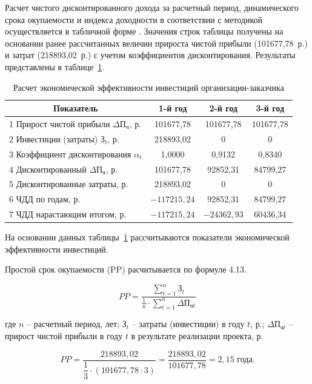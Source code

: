 Расчет чистого дисконтированного дохода за расчетный период, динамического срока окупаемости и индекса доходности в соответствии с методикой осуществляется в табличной форме \cite{Economics}. Значения строк таблицы получены на основании ранее рассчитанных величин прироста чистой прибыли (101677{,}78~р.) и затрат (218893{,}02~р.) с учетом коэффициентов дисконтирования. Результаты представлены в таблице~\ref{tab3}.
\begin{table}[!h!t]
\caption{Расчет экономической эффективности инвестиций организации-заказчика}
\label{tab3}
\centering
\begin{tabular}{|l|c|c|c|}
\hline
\multicolumn{1}{|c|}{Показатель} & 1-й год & 2-й год & 3-й год \\ \hline
1 Прирост чистой прибыли $\Delta\text{П}_{\text{ч}}$, р. & 101677{,}78 & 101677{,}78 & 101677{,}78 \\ \hline
2 Инвестиции (затраты) $\text{З}_t$, р. & 218893{,}02 & 0 & 0 \\ \hline
3 Коэффициент дисконтирования $\alpha_t$ & 1{,}0000 & 0{,}9132 & 0{,}8340 \\ \hline
4 Дисконтированный $\Delta\text{П}_{\text{ч}}$, р. & 101677{,}78 & 92852{,}31 & 84799{,}27 \\ \hline
5 Дисконтированные затраты, р. & 218893{,}02 & 0 & 0 \\ \hline
6 ЧДД по годам, р. & $-117215{,}24$ & 92852{,}31 & 84799{,}27 \\ \hline
7 ЧДД нарастающим итогом, р. & $-117215{,}24$ & $-24362{,}93$ & 60436{,}34 \\ \hline
\end{tabular}
\end{table}

На основании данных таблицы~\ref{tab3} рассчитываются показатели экономической эффективности инвестиций.

Простой срок окупаемости (PP) расчитывается по формуле 4.13.

\begin{equation}
    PP = \frac{\sum_{t=1}^{n} \text{З}_t}{\frac{1}{n} \cdot \sum_{t=1}^{n} \Delta\text{П}_{\text{ч}t}}
\end{equation}

где $n$ -- расчетный период, лет; $\text{З}_t$ -- затраты (инвестиции) в году $t$, р.; $\Delta\text{П}_{\text{ч}t}$ -- прирост чистой прибыли в году $t$ в результате реализации проекта, р.

$$
    PP = \frac{218893{,}02}{\dfrac{1}{3} \cdot (101677{,}78 \cdot 3)} = \frac{218893{,}02}{101677{,}78} = 2{,}15 \text{ года}.
$$

